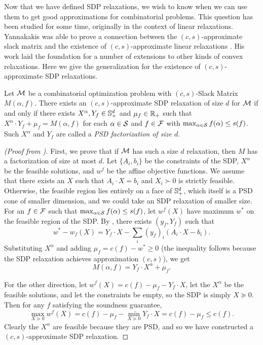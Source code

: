 Now that we have defined SDP relaxations, we wish to know when we can use them to get good approximations for combinatorial problems. This question has been studied for some time, originally in the context of linear relaxations. Yannakakis was able to prove a connection between the $(c,s)$-approximate slack matrix and the existence of $(c,s)$-approximate linear relaxations \cite{Yann88}. His work laid the foundation for a number of extensions to other kinds of convex relaxations. Here we give the generalization for the existence of $(c,s)$-approximate SDP relaxations.

\begin{theorem}\label{thm:yannakakis}
Let $\mathcal M$ be a combinatorial optimization problem with $(c,s)$-Slack Matrix $M(\alpha,f)$. There exists an $(c,s)$-approximate SDP relaxation of size $d$ for $\mathcal M$ if and only if there exists $X^\alpha,Y_f \in \mathbb{S}^{d}_+$ and $\mu_f \in \mathbb R_+$ such that $X^\alpha \cdot Y_f + \mu_f = M(\alpha,f)$ for each $\alpha \in \mathcal S $ and $f \in \mathcal F$ with $\max_{\alpha \in \mathcal S} f(\alpha) \leq s(f)$. Such $X^\alpha$ and $Y_f$ are called a \emph{PSD factorization of size $d$}.
\end{theorem}
\begin{proof}[(Proof from \cite{BPZ15})]
First, we prove that if $\mathcal M$ has such a size $d$ relaxation, then $M$ has a factorization of size at most $d$. Let $\{A_i, b_i\}$ be the constraints of the SDP, $X^\alpha$ be the feasible solutions, and $w^f$ be the affine objective functions. We assume that there exists an $X$ such that $A_i \cdot X = b_i$ and $X_i \succ 0$ is strictly feasible. Otherwise, the feasible region lies entirely on a face of $\mathbb{S}^{d}_+$, which itself is a PSD cone of smaller dimension, and we could take an SDP relaxation of smaller size. For an $f \in \mathcal F$ such that $\max_{\alpha \in \mathcal S} f(\alpha) \leq s(f)$, let $w^f(X)$ have maximum $w^*$ on the feasible region of the SDP. By , there exists $(y_f, Y_f)$ such that
\[w^* - w_f(X) = Y_f \cdot X - \sum_i (y_f)_i(A_i \cdot X - b_i).\]
Substituting $X^\alpha$ and adding $\mu_f = c(f) - w^* \geq 0$ (the inequality follows because the SDP relaxation achieves approximation $(c,s)$), we get
\[M(\alpha,f) = Y_f \cdot X^\alpha + \mu_f.\]

For the other direction, let $w^f(X) = c(f) - \mu_f - Y_f \cdot X$, let the $X^\alpha$ be the feasible solutions, and let the constraints be empty, so the SDP is simply $X \succeq 0$. Then for any $f$ satisfying the soundness guarantee,
\[\max_{X \succeq 0} w^f(X) = c(f) - \mu_f - \min_{X \succeq 0} Y_f \cdot X = c(f) - \mu_f \leq c(f).\]
Clearly the $X^\alpha$ are feasible because they are PSD, and so we have constructed a $(c,s)$-approximate SDP relaxation.
\end{proof}


